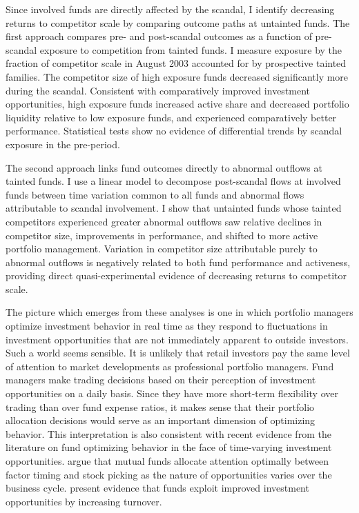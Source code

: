 \documentclass[openany]{book}
\theoremstyle{definition}
\theoremstyle{definition}
\theoremstyle{definition}
\theoremstyle{remark}
\begin{document}
Since involved funds are directly affected by the scandal, I identify
decreasing returns to competitor scale by comparing outcome paths at
untainted funds. The first approach compares pre- and post-scandal
outcomes as a function of pre-scandal exposure to competition from
tainted funds. I measure exposure by the fraction of competitor scale in
August 2003 accounted for by prospective tainted families. The
competitor size of high exposure funds decreased significantly more
during the scandal. Consistent with comparatively improved investment
opportunities, high exposure funds increased active share and decreased
portfolio liquidity relative to low exposure funds, and experienced
comparatively better performance. Statistical tests show no evidence of
differential trends by scandal exposure in the pre-period.

The second approach links fund outcomes directly to abnormal outflows at
tainted funds. I use a linear model to decompose post-scandal flows at
involved funds between time variation common to all funds and abnormal
flows attributable to scandal involvement. I show that untainted funds
whose tainted competitors experienced greater abnormal outflows saw
relative declines in competitor size, improvements in performance, and
shifted to more active portfolio management. Variation in competitor
size attributable purely to abnormal outflows is negatively related to
both fund performance and activeness, providing direct
quasi-experimental evidence of decreasing returns to competitor scale.

The picture which emerges from these analyses is one in which portfolio
managers optimize investment behavior in real time as they respond to
fluctuations in investment opportunities that are not immediately
apparent to outside investors. Such a world seems sensible. It is
unlikely that retail investors pay the same level of attention to market
developments as professional portfolio managers. Fund managers make
trading decisions based on their perception of investment opportunities
on a daily basis. Since they have more short-term flexibility over
trading than over fund expense ratios, it makes sense that their
portfolio allocation decisions would serve as an important dimension of
optimizing behavior. This interpretation is also consistent with recent
evidence from the literature on fund optimizing behavior in the face of
time-varying investment opportunities. \citet{knv16} argue that mutual
funds allocate attention optimally between factor timing and stock
picking as the nature of opportunities varies over the business cycle.
\citet{pst17} present evidence that funds exploit improved investment
opportunities by increasing turnover.
\end{document}
